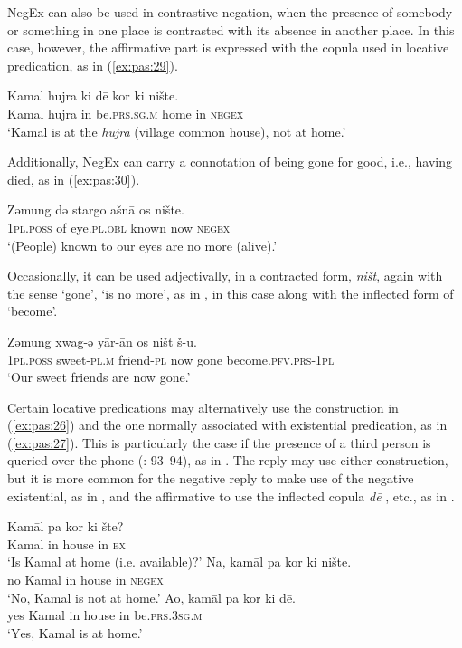 \documentclass[output=paper,colorlinks,citecolor=brown]{langscibook}
\begin{document}
NegEx can also be used in contrastive negation, when the presence of somebody or something in one place is contrasted with its absence in another place. In this case, however, the affirmative part is expressed with the copula used in locative predication, as in (\ref{ex:pas:29}).

\ea\label{ex:pas:29} 
    \gll  Kamal hujra ki d\={e} kor ki nište. \\ 
          Kamal hujra in be\textsc{.prs.sg.m} home in \textsc{negex}\\
    \glt ‘Kamal is at the \textit{hujra} (village common house), not at home.’ 
\z 

Additionally, NegEx can carry a connotation of being gone for good, i.e., having died, as in (\ref{ex:pas:30}).

\ea\label{ex:pas:30} 
    \gll  Zəmung də stargo ašn\={a}  os nište.\\ 
          \textsc{1pl.poss} of eye.\textsc{pl.obl} known now \textsc{negex}\\
    \glt ‘(People) known to our eyes are no more (alive).’
\z 

Occasionally, it can be used adjectivally, in a contracted form, \textit{ništ}, again with the sense ‘gone’, ‘is no more’, as in , in this case along with the inflected form of ‘become’.

\ea\label{ex:pas:31} 
    \gll  Zəmung xwag{}-ə y\={a}r{}-\={a}n os ništ š-u.\\ 
          \textsc{1pl.poss} sweet{}-\textsc{pl.m} friend{}-\textsc{pl} now gone become.\textsc{pfv.prs-1pl}\\
    \glt ‘Our sweet friends are now gone.’ 
\z 

Certain locative predications may alternatively use the construction in (\ref{ex:pas:26}) and the one normally associated with existential predication, as in (\ref{ex:pas:27}). This is particularly the case if the presence of a third person is queried over the phone (\citealt{TegeyRobson1996}: 93--94), as in . The reply may use either construction, but it is more common for the negative reply to make use of the negative existential, as in , and the affirmative to use the inflected copula \textit{d\={e} }, etc., as in . 

\ea\label{ex:pas:32}
    \ea\label{ex:pas:32a}
        \gll Kamāl pa kor ki šte? \\
             Kamal in house in \textsc{ex} \\
        \glt  ‘Is Kamal at home (i.e. available)?’
    \ex\label{ex:pas:32b}
        \gll Na, kamāl pa kor ki nište. \\
             no Kamal in house in \textsc{negex}\\
        \glt ‘No, Kamal is not at home.’
     \ex\label{ex:pas:32c}
        \gll Ao, kamāl pa kor ki d\={e}. \\
             yes Kamal in house in be.\textsc{prs.3sg.m}\\
        \glt \textsc{‘Y}es, Kamal is at home.’
    \z
\z 
\end{document}
